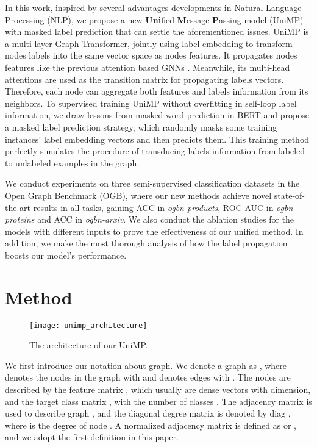 \documentclass{article} \usepackage{iclr2021_conference,times}
\begin{document}
In this work, inspired by several advantages developments \citep{vaswani2017attention, wang2018joint, devlin2018bert} in Natural Language Processing (NLP), we propose a new {\bf Uni}fied {\bf M}essage {\bf P}assing model (UniMP) with masked label prediction that can settle the aforementioned issues. UniMP is a multi-layer Graph Transformer, jointly using label embedding to transform nodes labels into the same vector space as nodes features. It propagates nodes features like the previous attention based GNNs \citep{velivckovic2017graph, zhang2018gaan}. Meanwhile, 
its multi-head attentions are used as the transition matrix for propagating labels vectors. Therefore, each node can aggregate both features and labels information from its neighbors. To supervised training UniMP without overfitting in self-loop label information, we draw lessons from masked word prediction in BERT \citep{devlin2018bert} and propose a masked label prediction strategy, which randomly masks some training instances' label embedding vectors and then predicts them. This training method perfectly simulates the procedure of transducing labels information from labeled to unlabeled examples in the graph.

We conduct experiments on three semi-supervised classification datasets in the Open Graph Benchmark (OGB), where our new methods achieve novel state-of-the-art results in all tasks, gaining  ACC in \emph{ogbn-products},  ROC-AUC in \emph{ogbn-proteins} and  ACC in \emph{ogbn-arxiv}. We also conduct the ablation studies for the models with different inputs to prove the effectiveness of our unified method. In addition, we make the most thorough analysis of how the label propagation boosts our model's performance.
\section{Method}
\begin{figure}[htbp]
	\centering
	\texttt{[image: unimp\_architecture]}
	\caption{
	 The architecture of our UniMP.
	}
	\label{figure:unimp_architecture}
\end{figure}
We first introduce our notation about graph. We denote a graph as , where  denotes the nodes in the graph with  and  denotes edges with . The nodes are described by the feature matrix , which usually are dense vectors with  dimension, and the target class matrix , with the number of classes . The adjacency matrix 
is used to describe graph , and the diagonal degree matrix is denoted by  diag , where  is the degree of node . A normalized adjacency matrix is defined as  or , and we adopt the first definition in this paper.
\end{document}
